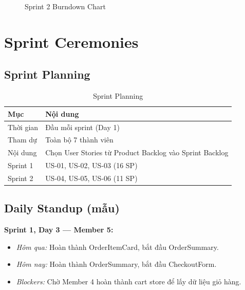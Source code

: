 \documentclass[12pt,a4paper]{article}
\begin{document}
\begin{figure}[H]
\centering
{}
\caption{Sprint 2 Burndown Chart}
\end{figure}

\section{Sprint Ceremonies}

\subsection{Sprint Planning}

\begin{table}[H]
\centering
\caption{Sprint Planning}
\begin{tabularx}{\textwidth}{lX}
\toprule
\textbf{Mục} & \textbf{Nội dung} \\
\midrule
Thời gian      & Đầu mỗi sprint (Day 1) \\
Tham dự        & Toàn bộ 7 thành viên \\
Nội dung       & Chọn User Stories từ Product Backlog vào Sprint Backlog \\
Sprint 1       & US-01, US-02, US-03 (16 SP) \\
Sprint 2       & US-04, US-05, US-06 (11 SP) \\
\bottomrule
\end{tabularx}
\end{table}

\subsection{Daily Standup (mẫu)}

\textbf{Sprint 1, Day 3 — Member 5:}
\begin{itemize}
  \item \textit{Hôm qua:} Hoàn thành OrderItemCard, bắt đầu OrderSummary.
  \item \textit{Hôm nay:} Hoàn thành OrderSummary, bắt đầu CheckoutForm.
  \item \textit{Blockers:} Chờ Member 4 hoàn thành cart store để lấy dữ liệu giỏ hàng.
\end{itemize}
\end{document}
